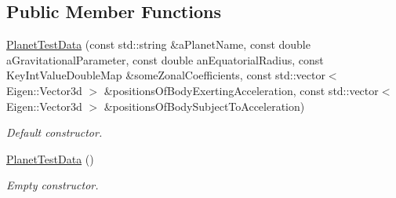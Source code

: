\subsection*{Public Member Functions}
\begin{DoxyCompactItemize}
\item 
\hyperlink{structtudat_1_1unit__tests_1_1PlanetTestData_ab0d782820c85c5fa513749f48af8fde5}{Planet\+Test\+Data} (const std\+::string \&a\+Planet\+Name, const double a\+Gravitational\+Parameter, const double an\+Equatorial\+Radius, const Key\+Int\+Value\+Double\+Map \&some\+Zonal\+Coefficients, const std\+::vector$<$ Eigen\+::\+Vector3d $>$ \&positions\+Of\+Body\+Exerting\+Acceleration, const std\+::vector$<$ Eigen\+::\+Vector3d $>$ \&positions\+Of\+Body\+Subject\+To\+Acceleration)\hypertarget{structtudat_1_1unit__tests_1_1PlanetTestData_ab0d782820c85c5fa513749f48af8fde5}{}\label{structtudat_1_1unit__tests_1_1PlanetTestData_ab0d782820c85c5fa513749f48af8fde5}

\begin{DoxyCompactList}\small\item\em Default constructor. \end{DoxyCompactList}\item 
\hyperlink{structtudat_1_1unit__tests_1_1PlanetTestData_a2cf7902a6d1d724a578b05cdae480603}{Planet\+Test\+Data} ()\hypertarget{structtudat_1_1unit__tests_1_1PlanetTestData_a2cf7902a6d1d724a578b05cdae480603}{}\label{structtudat_1_1unit__tests_1_1PlanetTestData_a2cf7902a6d1d724a578b05cdae480603}

\begin{DoxyCompactList}\small\item\em Empty constructor. \end{DoxyCompactList}\end{DoxyCompactItemize}
